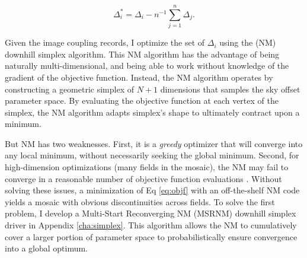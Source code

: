 \documentclass[iop]{emulateapj}
\begin{document}
\begin{equation}
    \Delta_i^* = \Delta_i - n^{-1}\sum_{j=1}^n \Delta_j.
    \label{eq:netzero}
\end{equation}

Given the image coupling records, I optimize the set of $\Delta_i$ using the \cite{Nelder:1965} (NM) downhill simplex algorithm. This NM algorithm has the advantage of being naturally multi-dimensional, and being able to work without knowledge of the gradient of the objective function. Instead, the NM algorithm operates by constructing a geometric simplex of $N+1$ dimensions that samples the sky offset parameter space. By evaluating the objective function at each vertex of the simplex, the NM algorithm adapts simplex's shape to ultimately contract upon a minimum.

But NM has two weaknesses. First, it is a \emph{greedy} optimizer that will converge into any local minimum, without necessarily seeking the global minimum. Second, for high-dimension optimizations (many fields in the mosaic), the NM may fail to converge in a reasonable number of objective function evaluations \citep{Neumann:2006}. Without solving these issues, a minimization of Eq \ref{eq:objf} with an off-the-shelf NM code yields a mosaic with obvious discontinuities across fields. To solve the first problem, I develop a Multi-Start Reconverging NM (MSRNM) downhill simplex driver in Appendix \ref{cha:simplex}. This algorithm allows the NM to cumulatively cover a larger portion of parameter space to probabilistically ensure convergence into a global optimum.



\end{document}
